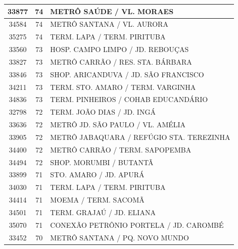 \documentclass[
	12pt,				%
	oneside,			%
	a4paper,			%
	english,			%
	brazil				%
	]{abntex2ppgsi}
\begin{document}
{{\begin{apendicesenv}
\begin{longtable}{c|c|p{7cm}}
    33877 & 74    & METRÔ SAÚDE / VL. MORAES \\
\hline

    34584 & 74    & METRÔ SANTANA / VL. AURORA \\
\hline

    35275 & 74    & TERM. LAPA / TERM. PIRITUBA \\
\hline

    33560 & 73    & HOSP. CAMPO LIMPO / JD. REBOUÇAS \\
\hline

    33827 & 73    & METRÔ CARRÃO / RES. STA. BÁRBARA \\
\hline

    33846 & 73    & SHOP. ARICANDUVA / JD. SÃO FRANCISCO \\
\hline

    34211 & 73    & TERM. STO. AMARO / TERM. VARGINHA \\
\hline

    34836 & 73    & TERM. PINHEIROS / COHAB EDUCANDÁRIO \\
\hline

    32798 & 72    & TERM. JOÃO DIAS / JD. INGÁ \\
\hline

    33636 & 72    & METRÔ JD. SÃO PAULO / VL. AMÉLIA \\
\hline

    33905 & 72    & METRÔ JABAQUARA / REFÚGIO STA. TEREZINHA \\
\hline

    34400 & 72    & METRÔ CARRÃO / TERM. SAPOPEMBA \\
\hline

    34494 & 72    & SHOP. MORUMBI / BUTANTÃ \\
\hline

    33899 & 71    & STO. AMARO / JD. APURÁ \\
\hline

    34030 & 71    & TERM. LAPA / TERM. PIRITUBA \\
\hline

    34414 & 71    & MOEMA / TERM. SACOMÃ \\
\hline

    34501 & 71    & TERM. GRAJAÚ / JD. ELIANA \\
\hline

    35070 & 71    & CONEXÃO PETRÔNIO PORTELA / JD. CAROMBÉ \\
\hline

    33452 & 70    & METRÔ SANTANA / PQ. NOVO MUNDO \\
\hline


\end{longtable}
\end{apendicesenv}}}
\end{document}
